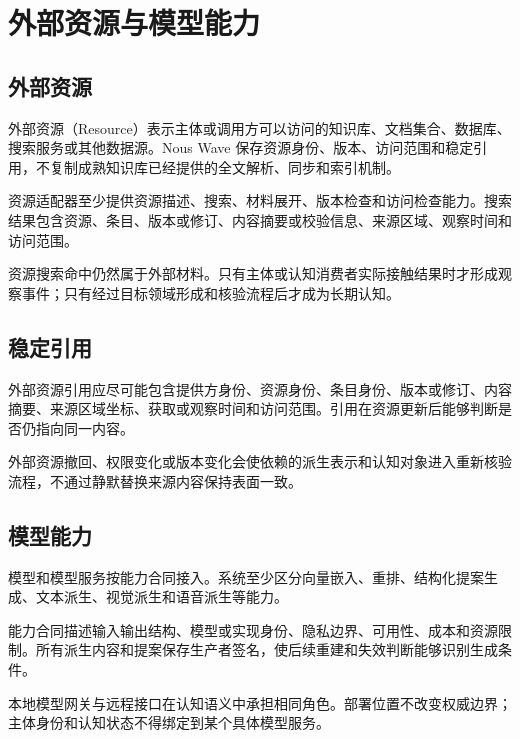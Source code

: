 \chapter{外部资源与模型能力}

\section{外部资源}

外部资源（Resource）表示主体或调用方可以访问的知识库、文档集合、数据库、搜索服务或其他数据源。Nous Wave 保存资源身份、版本、访问范围和稳定引用，不复制成熟知识库已经提供的全文解析、同步和索引机制。

资源适配器至少提供资源描述、搜索、材料展开、版本检查和访问检查能力。搜索结果包含资源、条目、版本或修订、内容摘要或校验信息、来源区域、观察时间和访问范围。

资源搜索命中仍然属于外部材料。只有主体或认知消费者实际接触结果时才形成观察事件；只有经过目标领域形成和核验流程后才成为长期认知。

\section{稳定引用}

外部资源引用应尽可能包含提供方身份、资源身份、条目身份、版本或修订、内容摘要、来源区域坐标、获取或观察时间和访问范围。引用在资源更新后能够判断是否仍指向同一内容。

外部资源撤回、权限变化或版本变化会使依赖的派生表示和认知对象进入重新核验流程，不通过静默替换来源内容保持表面一致。

\section{模型能力}

模型和模型服务按能力合同接入。系统至少区分向量嵌入、重排、结构化提案生成、文本派生、视觉派生和语音派生等能力。

能力合同描述输入输出结构、模型或实现身份、隐私边界、可用性、成本和资源限制。所有派生内容和提案保存生产者签名，使后续重建和失效判断能够识别生成条件。

本地模型网关与远程接口在认知语义中承担相同角色。部署位置不改变权威边界；主体身份和认知状态不得绑定到某个具体模型服务。
